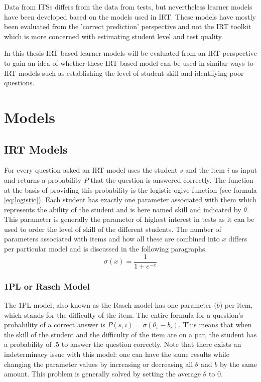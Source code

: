 \documentclass{scrartcl}
\begin{document}
Data from ITSs differs from the data from tests, but nevertheless learner models have been developed based on the models used in IRT. These models have mostly been evaluated from the 'correct prediction' perspective and not the IRT toolkit which is more concerned with estimating student level and test quality.

In this thesis IRT based learner models will be evaluated from an IRT perspective to gain an idea of whether these IRT based model can be used in similar ways to IRT models such as establishing the level of student skill and identifying poor questions. 

\section{Models}
\subsection{IRT Models}
For every question asked an IRT model uses the student $s$ and the item $i$ as input and returns a probability $P$ that the question is answered correctly. The function at the basis of providing this probability is the logistic ogive function (see formula \ref{eq:logistic}). Each student has exactly one parameter associated with them which represents the ability of the student and is here named skill and indicated by $\theta$. This parameter is generally the parameter of highest interest in tests as it can be used to order the level of skill of the different students. The number of parameters associated with items and how all these are combined into $x$ differs per particular model and is discussed in the following paragraphs.
\begin{equation}
\label{eq:logistic}
\sigma(x) = \frac{1}{1+e^{-x}}
\end{equation}

\subsubsection{1PL or Rasch Model}
\label{sec:1PL}
The 1PL model, also known as the Rasch model has one parameter ($b$) per item, which stands for the difficulty of the item. The entire formula for a question's probability of a correct answer is $P(s,i) = \sigma(\theta_{s} - b_{i})$. This means that when the skill of the student and the difficulty of the item are on a par, the student has a probability of .5 to answer the question correctly. Note that there exists an indeterminacy issue with this model: one can have the same results while changing the parameter values by increasing or decreasing all $\theta$ and $b$ by the same amount. This problem is generally solved by setting the average $\theta$ to 0.
\end{document}
